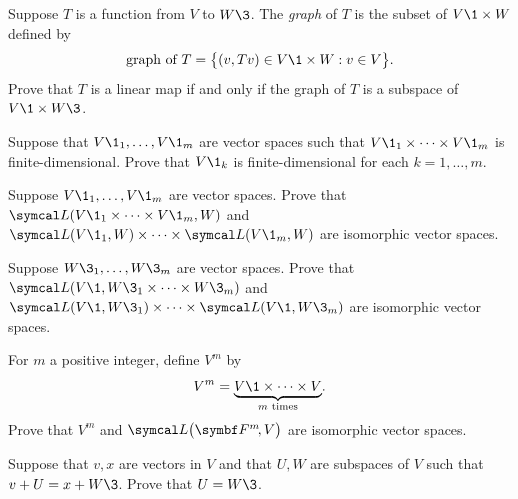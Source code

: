 \begin{exercises}

\exercise
Suppose $T$ is a function from $V$ to $W\3$. The \emph{graph} of $T$ is the subset of
$V\1 \times W$ defined by
\[
\text{graph of}\ T = \br[\big]{ (v, Tv) \in V\1 \times W: v \in V }.
\]
Prove that $T$ is a linear map if and only if the graph of $T$
is a subspace of $V\1 \times W\3$.


\exercise
Suppose that $V\1_1, \dots, V\1_m$ are vector spaces such that $V\1_1 \times \dots \times V\1_m$ is finite-dimensional. Prove that $V\1_k$ is finite-dimensional for each $k = 1, \dots, m$.

\exercise
Suppose $V\1_1, \dots, V\1_m$ are vector spaces. Prove that $\L(V\1_1 \times \dots \times V\1_m, W)$ and $\L(V\1_1, W) \times \dots \times \L(V\1_m, W)$ are isomorphic vector spaces.



\exercise
Suppose $W\3_1, \dots, W\3_m$ are vector spaces. Prove that $\L(V\1, W\3_1 \times \dots \times W\3_m)$ and
$\L(V\1, W\3_1) \times \dots \times \L(V\1, W\3_m)$ are isomorphic vector spaces.


\exercise
For $m$ a positive integer, define $V^m$ by
\[
V^m = \underbrace{V\1 \times \dots \times V}_{m \text{\ times}}\!.
\]
Prove that $V^m$ and $\L\paren[\big]{\FF{m}, V}$ are isomorphic vector spaces.


\exercise
Suppose that $v, x$ are vectors in $V$ and that $U, W$ are subspaces of $V$ such that $v + U = x + W\3$. Prove that $U = W\3$.



\end{exercises}
